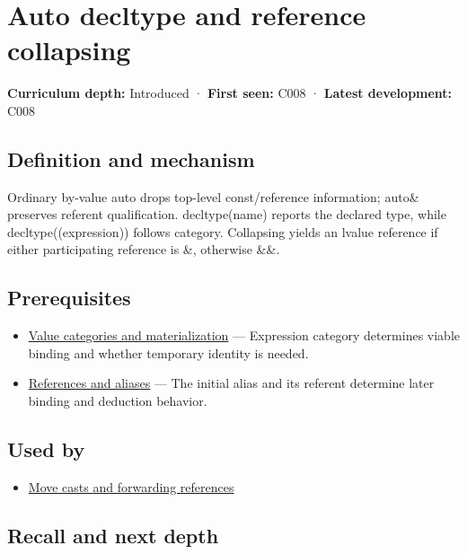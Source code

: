 \hypertarget{appendix-5d4252a42886}{}\label{referencestart:appendix-5d4252a42886}
\section{Auto decltype and reference collapsing}\label{appendix-5d4252a42886-auto-decltype-and-reference-collapsing}

\textbf{Curriculum depth:} Introduced · \textbf{First seen:} C008 · \textbf{Latest development:} C008

\subsection{Definition and mechanism}\label{appendix-5d4252a42886-definition-and-mechanism}

Ordinary by-value auto drops top-level const/reference information; auto\& preserves referent qualification. decltype(name) reports the declared type, while decltype((expression)) follows category. Collapsing yields an lvalue reference if either participating reference is \&, otherwise \&\&.

\subsection{Prerequisites}\label{appendix-5d4252a42886-prerequisites}

\begin{itemize}
\tightlist
\item
  \hyperref[appendix-1121b30eaeb0]{Value categories and materialization} --- Expression category determines viable binding and whether temporary identity is needed.
\item
  \hyperref[appendix-d6d562ca9fbb]{References and aliases} --- The initial alias and its referent determine later binding and deduction behavior.
\end{itemize}

\subsection{Used by}\label{appendix-5d4252a42886-used-by}

\begin{itemize}
\tightlist
\item
  \hyperref[appendix-0104b704fb11]{Move casts and forwarding references}
\end{itemize}

\subsection{Recall and next depth}\label{appendix-5d4252a42886-recall-and-next-depth}

